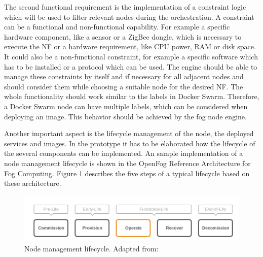 The second functional requirement is the implementation of a constraint logic which will be used to filter relevant nodes during the orchestration.
A constraint can be a functional and non-functional capability.
For example a specific hardware component, like a sensor or a ZigBee dongle, which is necessary to execute the \ac{NF} or a hardware requirement, like \ac{CPU} power, \ac{RAM} or disk space.
It could also be a non-functional constraint, for example a specific software which has to be installed or a protocol which can be used.
The engine should be able to manage these constraints by itself and if necessary for all adjacent nodes and should consider them while choosing a suitable node for the desired \ac{NF}.
The whole functionality should work similar to the labels in Docker Swarm.
Therefore, a Docker Swarm node can have multiple labels, which can be considered when deploying an image.
This behavior should be achieved by the fog node engine.

Another important aspect is the lifecycle management of the node, the deployed services and images.
In the prototype it has to be elaborated how the lifecycle of the several components can be implemented.
An sample implementation of a node management lifecycle is shown in the OpenFog Reference Architecture for Fog Computing\autocite[p. 52 f.]{OpenFog:2017}.
Figure \ref{fig:open_fog_node_mgm_lifecycle} describes the five steps of a typical lifecycle based on these architecture.
\begin{figure}[H]
    \centering
    \includegraphics[width=\textwidth]{resources/images/node_management_lifecycle.png}
    \caption[Node management lifecycle]{Node management lifecycle. Adapted from: \autocite[p. 52]{OpenFog:2017}}
    \label{fig:open_fog_node_mgm_lifecycle}
\end{figure}

